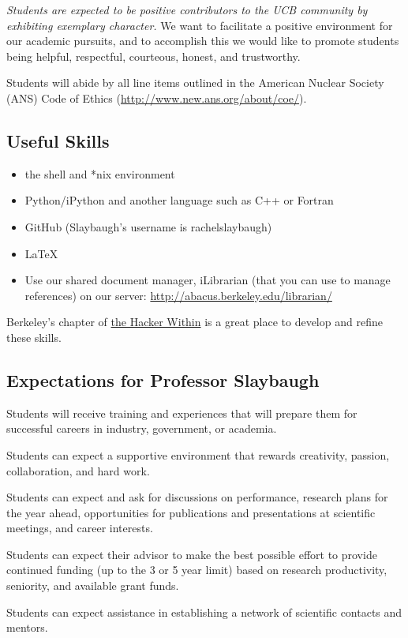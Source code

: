 \documentclass[12pt,twoside]{article}
\begin{document}
\textit{Students are expected to be positive contributors to the UCB community by exhibiting exemplary character.} We want to facilitate a positive environment for our academic pursuits, and to accomplish this we would like to promote students being helpful, respectful, courteous, honest, and trustworthy. 

Students will abide by all line items outlined in the American Nuclear Society (ANS) Code of Ethics (\href{http://www.new.ans.org/about/coe/}{http://www.new.ans.org/about/coe/}). 

\begin{center}
\subsection*{Useful Skills}
\end{center}

\begin{itemize}
\item the shell and *nix environment
\item Python/iPython and another language such as C++ or Fortran
\item GitHub (Slaybaugh's username is rachelslaybaugh)
\item \LaTeX
\item Use our shared document manager, iLibrarian (that you can use to manage references) on our server: \href{http://abacus.berkeley.edu/librarian/}{http://abacus.berkeley.edu/librarian/}
\end{itemize}

Berkeley's chapter of \href{http://www.thehackerwithin.org/berkeley/}{the Hacker Within} is a great place to develop and refine these skills.

\begin{center}
\section*{Expectations for Professor Slaybaugh}
\end{center}

Students will receive training and experiences that will prepare them for successful careers in industry, government, or academia.

Students can expect a supportive environment that rewards creativity, passion, collaboration, and hard work.

Students can expect and ask for discussions on performance, research plans for the year ahead, opportunities for publications and presentations at scientific meetings, and career interests.

Students can expect their advisor to make the best possible effort to provide continued funding (up to the 3 or 5 year limit) based on research productivity, seniority, and available grant funds.

Students can expect assistance in establishing a network of scientific contacts and mentors.
\end{document}
